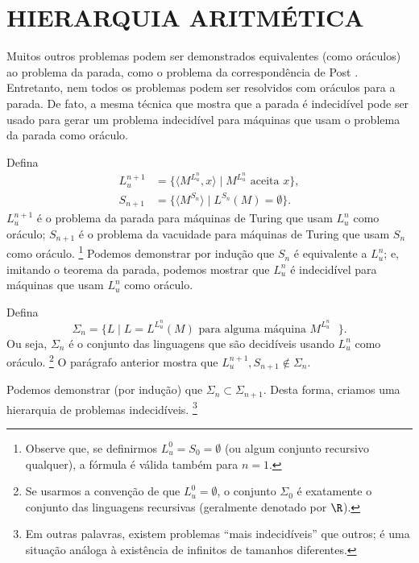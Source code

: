 \section{HIERARQUIA ARITMÉTICA}
\label{sec:arithmetical_hierarchy}

Muitos outros problemas podem ser demonstrados equivalentes
(como oráculos)
ao problema da parada,
como o problema da correspondência de Post \cite[p.~214]{HopcroftUllman1979}.
Entretanto,
nem todos os problemas podem ser resolvidos com oráculos para a parada.
De fato, a mesma técnica que mostra que a parada é indecidível
pode ser usado para gerar um problema indecidível
para máquinas que usam o problema da parada como oráculo.

Defina
\begin{align*}
    L_u^{n+1} &= \{ \langle M^{L_u^n}, x \rangle \mid M^{L_u^n} \text{ aceita } x \}, \\
    S_{n+1} &= \{ \langle M^{S_n} \rangle \mid L^{S_n}(M) = \emptyset \}.
\end{align*}
$L_u^{n+1}$ é o problema da parada
para máquinas de Turing que usam $L_u^n$ como oráculo;
$S_{n+1}$ é o problema da vacuidade
para máquinas de Turing que usam $S_n$ como oráculo.%
\footnote{
    Observe que,
    se definirmos $L_u^0 = S_0 = \emptyset$
    (ou algum conjunto recursivo qualquer),
    a fórmula é válida também para $n = 1$.
}
Podemos demonstrar por indução que $S_n$ é equivalente a $L_u^n$;
e, imitando o teorema da parada,
podemos mostrar que $L_u^n$ é indecidível para máquinas que usam $L_u^n$ como oráculo.

Defina
\begin{equation*}
    \Sigma_n = \{ L \mid L = L^{L_u^n}(M) \text{ para alguma máquina $M^{L_u^n}$ } \}.
\end{equation*}
Ou seja, $\Sigma_n$ é o conjunto das linguagens
que são decidíveis usando $L_u^n$ como oráculo.%
\footnote{
    Se usarmos a convenção de que $L_u^0 = \emptyset$,
    o conjunto $\Sigma_0$ é exatamente o conjunto das linguagens recursivas
    (geralmente denotado por $\R$).
}
O parágrafo anterior mostra que $L_u^{n+1}, S_{n+1} \notin \Sigma_n$.

Podemos demonstrar (por indução) que $\Sigma_n \subset \Sigma_{n+1}$.
Desta forma,
criamos uma hierarquia de problemas indecidíveis.%
\footnote{
    Em outras palavras,
    existem problemas ``mais indecidíveis'' que outros;
    é uma situação análoga à existência de infinitos de tamanhos diferentes.
}

